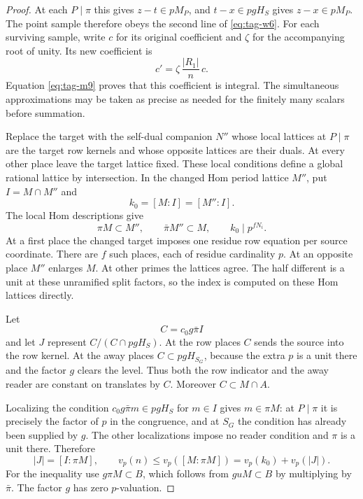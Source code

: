 \begin{proof}
At each
\(P\mid\pi\) this gives
\(z-t\in pM_P\), and \(t-x\in pgH_S\) gives
\(z-x\in pM_P\). The point sample therefore obeys
the second line of \eqref{eq:tag-w6}. For each surviving sample, write \(c\) for its original coefficient and \(\zeta\) for the accompanying root of unity. Its new coefficient is
\[
  c'=\zeta\,\frac{|R_1|}{n}\,c.
\]
 Equation \eqref{eq:tag-m9} proves that this
coefficient is integral. The simultaneous approximations may be taken as
precise as needed for the finitely many scalars before
summation.
\label{cor:word-projection-2}


Replace the target with the self-dual companion
\(N''\) whose local lattices at \(P\mid\pi\) are the
target row kernels and whose opposite lattices are
their duals. At every other place leave the target
lattice fixed. These local conditions define a
global rational lattice by intersection. In the
changed Hom period lattice \(M''\), put
\(I=M\cap M''\) and 
\[
  k_0=[M:I]=[M'':I].
\]
The local Hom descriptions give
\[
     \pi M\subset M'',\qquad \bar\pi M''\subset M,\qquad
                         k_0\mid p^{fN_i}.
\tag{M10}\label{eq:tag-m10}
\]
At a first place the changed target imposes one
residue row equation per source coordinate. There
are \(f\) such places, each of residue cardinality
\(p\). At an opposite place \(M''\) enlarges \(M\).
At other primes the lattices agree. The half different
is a unit at these unramified split factors, so the
index is computed on these Hom lattices directly.

Let 
\[
  C=c_0g\bar\pi I
\]
 and let \(J\) represent
\(C/(C\cap pgH_S)\). At the row places \(C\) sends the
source into the row kernel. At the away places
\(C\subset pgH_{S_G}\), because the extra \(p\) is
a unit there and the factor \(g\) clears the level.
Thus both the row indicator and the away reader
are constant on translates by \(C\). Moreover
\(C\subset M\cap A\).

Localizing the condition
\(c_0g\bar\pi m\in pgH_S\) for \(m\in I\) gives
\(m\in\pi M\): at \(P\mid\pi\) it is precisely
the factor of \(p\) in the congruence, and at
\(S_G\) the condition has already been supplied
by \(g\). The other localizations impose no reader
condition and \(\pi\) is a unit there. Therefore
\[
                  |J|=[I:\pi M],\qquad
       v_p(n)\le v_p([M:\pi M])
                  =v_p(k_0)+v_p(|J|).
\tag{M11}\label{eq:tag-m11}
\]
For the inequality use \(g\pi M\subset B\), which
follows from \(guM\subset B\) by multiplying by
\(\bar\pi\). The factor \(g\) has zero \(p\)-valuation.


\end{proof}
